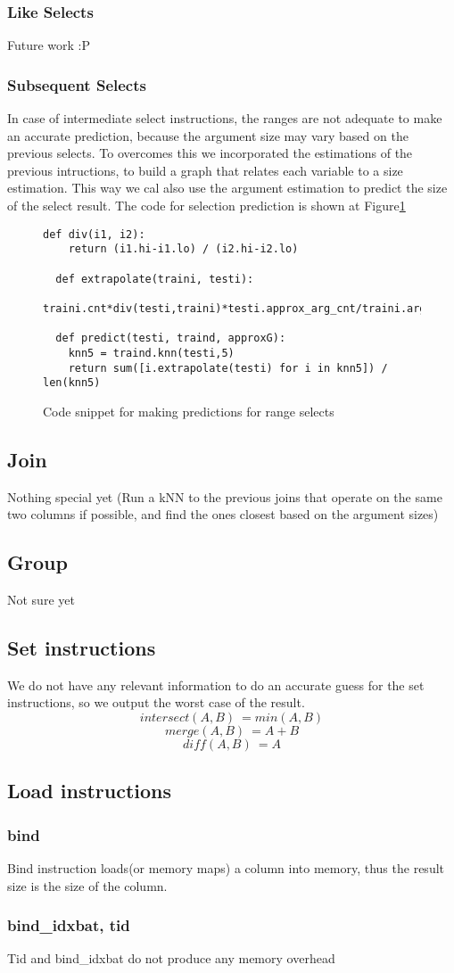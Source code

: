 \subsubsection{Like Selects}
Future work :P

\subsubsection{Subsequent Selects}
In case of intermediate select instructions, the ranges are not adequate to
make an accurate prediction, because the argument size may vary based on the
previous selects. To overcomes this we incorporated the estimations of the
previous intructions, to build a graph that relates each variable to a size
estimation. This way we cal also use the argument estimation to predict the
size of the select result. The code for selection prediction is shown at
Figure\ref{sel:code}

\begin{figure}[t]
\begin{lstlisting}[frame=single]
  def div(i1, i2):
    return (i1.hi-i1.lo) / (i2.hi-i2.lo)

  def extrapolate(traini, testi):
      traini.cnt*div(testi,traini)*testi.approx_arg_cnt/traini.argcnt

  def predict(testi, traind, approxG):
    knn5 = traind.knn(testi,5)
    return sum([i.extrapolate(testi) for i in knn5]) / len(knn5)
\end{lstlisting}
  \caption{Code snippet for making predictions for range selects}
  \label{sel:code}
\end{figure}


\subsection{Join}
Nothing special yet
(Run a kNN to the previous joins that operate on the same two columns if possible,
and find the ones closest based on the argument sizes)
\subsection{Group}
Not sure yet

\subsection{Set instructions}
We do not have any relevant information to do an accurate guess for the
set instructions, so we output the worst case of the result.
$$ intersect(A,B) ~= min(A,B)$$
$$ merge(A,B) ~= A+B $$
$$ diff(A,B) ~= A $$

\subsection{Load instructions}
\subsubsection{bind}
Bind instruction loads(or memory maps) a column into memory,
thus the result size is the size of the column.
\subsubsection{bind\_idxbat, tid}
Tid and bind\_idxbat do not produce any memory overhead
